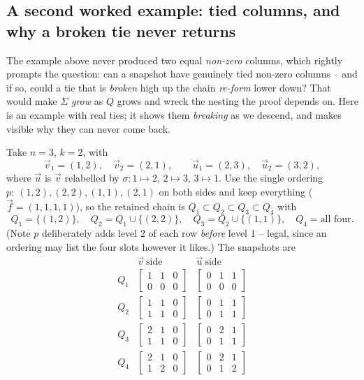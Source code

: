 \documentclass{article}
\begin{document}
\subsection*{A second worked example: tied columns, and why a broken tie never returns}

The example above never produced two equal \emph{non-zero} columns, which rightly
prompts the question: can a snapshot have genuinely tied non-zero columns -- and if
so, could a tie that is \emph{broken} high up the chain \emph{re-form} lower down?
That would make $\Sigma$ \emph{grow} as $Q$ grows and wreck the nesting the proof
depends on.  Here is an example with real ties; it shows them \emph{breaking} as we
descend, and makes visible why they can never come back.

Take $n=3$, $k=2$, with
\[
\vec v_1=(1,2),\quad \vec v_2=(2,1),
\qquad
\vec u_1=(2,3),\quad \vec u_2=(3,2),
\]
where $\vec u$ is $\vec v$ relabelled by $\sigma:1\mapsto2,\,2\mapsto3,\,3\mapsto1$.
Use the single ordering $p:\ (1,2),(2,2),(1,1),(2,1)$ on both sides and keep
everything ($\vec f=(1,1,1,1)$), so the retained chain is
$Q_1\subset Q_2\subset Q_3\subset Q_4$ with
\[
Q_1=\{(1,2)\},\quad Q_2=Q_1\cup\{(2,2)\},\quad
Q_3=Q_2\cup\{(1,1)\},\quad Q_4=\text{all four}.
\]
(Note $p$ deliberately adds level $2$ of each row \emph{before} level $1$ -- legal,
since an ordering may list the four slots however it likes.)  The snapshots are
\[
\renewcommand{\arraystretch}{2.4}
\begin{array}{c|c|c}
 & \vec v\ \text{side} & \vec u\ \text{side}\\\hline
Q_1 & \begin{bmatrix}1&1&0\\0&0&0\end{bmatrix}
    & \begin{bmatrix}0&1&1\\0&0&0\end{bmatrix}\\
Q_2 & \begin{bmatrix}1&1&0\\1&1&0\end{bmatrix}
    & \begin{bmatrix}0&1&1\\0&1&1\end{bmatrix}\\
Q_3 & \begin{bmatrix}2&1&0\\1&1&0\end{bmatrix}
    & \begin{bmatrix}0&2&1\\0&1&1\end{bmatrix}\\
Q_4 & \begin{bmatrix}2&1&0\\1&2&0\end{bmatrix}
    & \begin{bmatrix}0&2&1\\0&1&2\end{bmatrix}
\end{array}
\]
\end{document}

